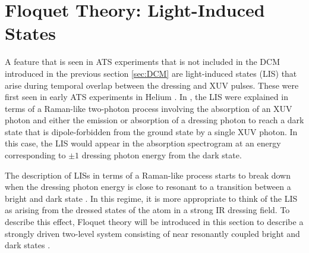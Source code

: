 \section{Floquet Theory: Light-Induced States}
\label{sec:LIS_Floquet}

A feature that is seen in ATS experiments that is not included in the DCM introduced in the previous section \ref{sec:DCM} are light-induced states (LIS) that arise during temporal overlap between the dressing and XUV pulses.  These were first seen in early ATS experiments in Helium \cite{chenLightinducedStatesAttosecond2012, chiniSubcycleOscillationsVirtual2013}.  In \cite{chenLightinducedStatesAttosecond2012}, the LIS were explained in terms of a Raman-like two-photon process involving the absorption of an XUV photon and either the emission or absorption of a dressing photon to reach a dark state that is dipole-forbidden from the ground state by a single XUV photon. In this case, the LIS would appear in the absorption spectrogram at an energy corresponding to $\pm1$ dressing photon energy from the dark state.

The description of LISs in terms of a Raman-like process starts to break down when the dressing photon energy is close to resonant to a transition between a bright and dark state \cite{wuTheoryStrongfieldAttosecond2016}.  In this regime, it is more appropriate to think of the LIS as arising from the dressed states of the atom in a strong IR dressing field.  To describe this effect, Floquet theory will be introduced in this section to describe a strongly driven two-level system consisting of near resonantly coupled bright and dark states \cite{shirleySolutionSchrOdinger1965,reduzziPolarizationControlAbsorption2015, wuTheoryStrongfieldAttosecond2016}. 

